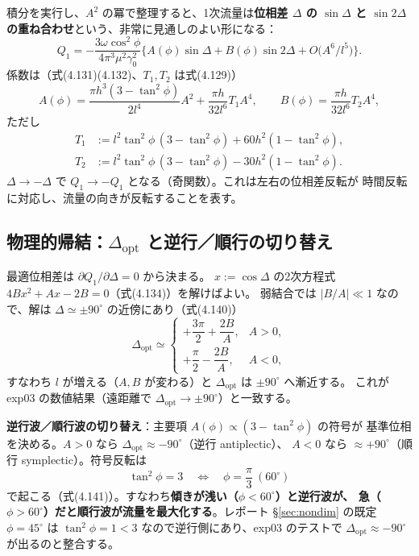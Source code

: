\documentclass[11pt,a4paper]{article}
\newcommand{\gamz}{\gamma_{0}}
\newcommand{\Dopt}{\Delta_{\mathrm{opt}}}
\begin{document}
積分を実行し、$A^2$ の冪で整理すると、1次流量は\textbf{位相差 $\Delta$ の
$\sin\Delta$ と $\sin2\Delta$ の重ね合わせ}という、非常に見通しのよい形になる：
\begin{equation}
\boxed{\;Q_1=-\frac{3\omega\cos^2\!\phi}{4\pi^3\mu^2\gamz^2}
\Big\{A(\phi)\sin\Delta+B(\phi)\sin2\Delta+O\!\big(A^6/l^5\big)\Big\}.\;}
\end{equation}
係数は（式(4.131)(4.132)、$T_1,T_2$ は式(4.129)）
\begin{equation}
A(\phi)=\frac{\pi h^3(3-\tan^2\!\phi)}{2 l^4}A^2+\frac{\pi h}{32 l^6}T_1 A^4,
\qquad
B(\phi)=\frac{\pi h}{32 l^6}T_2 A^4,
\end{equation}
ただし
\begin{align}
T_1&:=l^2\tan^2\!\phi\,(3-\tan^2\!\phi)+60h^2(1-\tan^2\!\phi),\\
T_2&:=l^2\tan^2\!\phi\,(3-\tan^2\!\phi)-30h^2(1-\tan^2\!\phi).
\end{align}
$\Delta\to-\Delta$ で $Q_1\to-Q_1$ となる（奇関数）。これは左右の位相差反転が
時間反転に対応し、流量の向きが反転することを表す。

\subsection{物理的帰結：$\Dopt$ と逆行／順行の切り替え}

最適位相差は $\partial Q_1/\partial\Delta=0$ から決まる。
$x:=\cos\Delta$ の2次方程式 $4Bx^2+Ax-2B=0$（式(4.134)）を解けばよい。
弱結合では $|B/A|\ll1$ なので、解は $\Delta\simeq\pm90^\circ$ の近傍にあり（式(4.140)）
\begin{equation}
\Dopt\simeq
\begin{cases}
+\dfrac{3\pi}{2}+\dfrac{2B}{A}, & A>0,\\[6pt]
+\dfrac{\pi}{2}-\dfrac{2B}{A}, & A<0,
\end{cases}
\end{equation}
すなわち $l$ が増える（$A,B$ が変わる）と $\Dopt$ は $\pm90^\circ$ へ漸近する。
これが exp03 の数値結果（遠距離で $\Dopt\to\pm90^\circ$）と一致する。

\begin{keybox}
\textbf{逆行波／順行波の切り替え}：主要項 $A(\phi)\propto(3-\tan^2\!\phi)$ の符号が
基準位相を決める。$A>0$ なら $\Dopt\approx-90^\circ$（逆行 antiplectic）、
$A<0$ なら $\approx+90^\circ$（順行 symplectic）。符号反転は
\begin{equation}
\tan^2\!\phi=3\quad\Longleftrightarrow\quad \phi=\frac{\pi}{3}\ (60^\circ)
\end{equation}
で起こる（式(4.141)）。すなわち\textbf{傾きが浅い（$\phi<60^\circ$）と逆行波が、
急（$\phi>60^\circ$）だと順行波が流量を最大化する}。レポート §\ref{sec:nondim}
の既定 $\phi=45^\circ$ は $\tan^2\!\phi=1<3$ なので逆行側にあり、exp03 のテストで
$\Dopt\approx-90^\circ$ が出るのと整合する。
\end{keybox}
\end{document}
